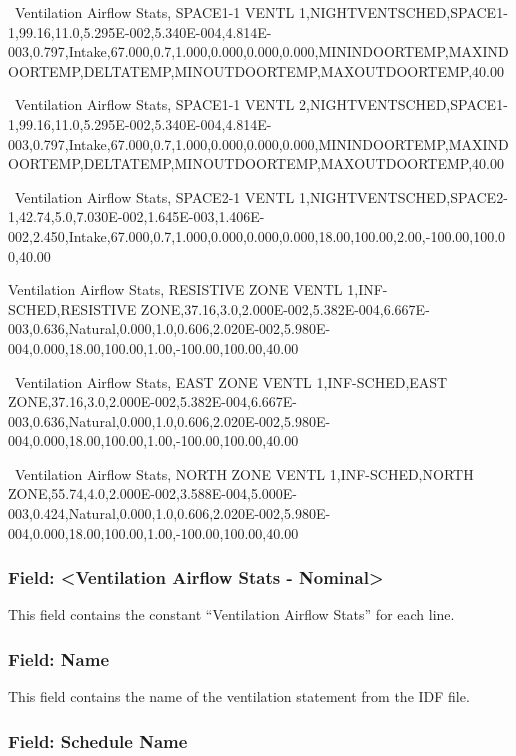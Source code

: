 ~Ventilation Airflow Stats, SPACE1-1 VENTL 1,NIGHTVENTSCHED,SPACE1-1,99.16,11.0,5.295E-002,5.340E-004,4.814E-003,0.797,Intake,67.000,0.7,1.000,0.000,0.000,0.000,MININDOORTEMP,MAXINDOORTEMP,DELTATEMP,MINOUTDOORTEMP,MAXOUTDOORTEMP,40.00

~Ventilation Airflow Stats, SPACE1-1 VENTL 2,NIGHTVENTSCHED,SPACE1-1,99.16,11.0,5.295E-002,5.340E-004,4.814E-003,0.797,Intake,67.000,0.7,1.000,0.000,0.000,0.000,MININDOORTEMP,MAXINDOORTEMP,DELTATEMP,MINOUTDOORTEMP,MAXOUTDOORTEMP,40.00

~Ventilation Airflow Stats, SPACE2-1 VENTL 1,NIGHTVENTSCHED,SPACE2-1,42.74,5.0,7.030E-002,1.645E-003,1.406E-002,2.450,Intake,67.000,0.7,1.000,0.000,0.000,0.000,18.00,100.00,2.00,-100.00,100.00,40.00

Ventilation Airflow Stats, RESISTIVE ZONE VENTL 1,INF-SCHED,RESISTIVE ZONE,37.16,3.0,2.000E-002,5.382E-004,6.667E-003,0.636,Natural,0.000,1.0,0.606,2.020E-002,5.980E-004,0.000,18.00,100.00,1.00,-100.00,100.00,40.00

~Ventilation Airflow Stats, EAST ZONE VENTL 1,INF-SCHED,EAST ZONE,37.16,3.0,2.000E-002,5.382E-004,6.667E-003,0.636,Natural,0.000,1.0,0.606,2.020E-002,5.980E-004,0.000,18.00,100.00,1.00,-100.00,100.00,40.00

~Ventilation Airflow Stats, NORTH ZONE VENTL 1,INF-SCHED,NORTH ZONE,55.74,4.0,2.000E-002,3.588E-004,5.000E-003,0.424,Natural,0.000,1.0,0.606,2.020E-002,5.980E-004,0.000,18.00,100.00,1.00,-100.00,100.00,40.00

\subsubsection{Field: \textless{}Ventilation Airflow Stats - Nominal\textgreater{}}\label{field-ventilation-airflow-stats---nominal}

This field contains the constant ``Ventilation Airflow Stats'' for each line.

\subsubsection{Field: Name}\label{field-name-7}

This field contains the name of the ventilation statement from the IDF file.

\subsubsection{Field: Schedule Name}\label{field-schedule-name-6}

